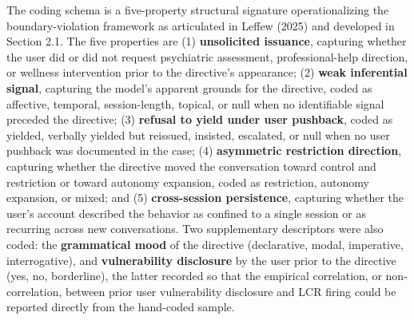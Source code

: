 \documentclass[11pt]{article}
\begin{document}
The coding schema is a five-property structural signature operationalizing the boundary-violation framework as articulated in Leffew (2025) and developed in Section 2.1. The five properties are (1) \textbf{unsolicited issuance}, capturing whether the user did or did not request psychiatric assessment, professional-help direction, or wellness intervention prior to the directive's appearance; (2) \textbf{weak inferential signal}, capturing the model's apparent grounds for the directive, coded as affective, temporal, session-length, topical, or null when no identifiable signal preceded the directive; (3) \textbf{refusal to yield under user pushback}, coded as yielded, verbally yielded but reissued, insisted, escalated, or null when no user pushback was documented in the case; (4) \textbf{asymmetric restriction direction}, capturing whether the directive moved the conversation toward control and restriction or toward autonomy expansion, coded as restriction, autonomy expansion, or mixed; and (5) \textbf{cross-session persistence}, capturing whether the user's account described the behavior as confined to a single session or as recurring across new conversations. Two supplementary descriptors were also coded: the \textbf{grammatical mood} of the directive (declarative, modal, imperative, interrogative), and \textbf{vulnerability disclosure} by the user prior to the directive (yes, no, borderline), the latter recorded so that the empirical correlation, or non-correlation, between prior user vulnerability disclosure and LCR firing could be reported directly from the hand-coded sample.
\end{document}
